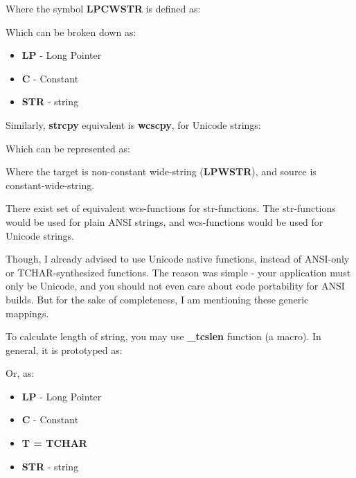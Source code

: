 	
	Where the symbol \textbf{LPCWSTR} is defined as:
	
	
	Which can be broken down as:\\
	
	\begin{itemize}
		\item \textbf{LP} - Long Pointer
		\item \textbf{C} - Constant
		\item \textbf{STR} - string
	\end{itemize}
	
	
	Similarly, \textbf{strcpy} equivalent is \textbf{wcscpy}, for Unicode strings:
	
	
	Which can be represented as:\\
	
	
	Where the target is non-constant wide-string (\textbf{LPWSTR}), and source is constant-wide-string.
	
	There exist set of equivalent wcs-functions for str-functions. The str-functions would be used for plain ANSI strings, and wcs-functions would be used for Unicode strings.
	
	Though, I already advised to use Unicode native functions, instead of ANSI-only or TCHAR-synthesized functions. The reason was simple - your application must only be Unicode, and you should not even care about code portability for ANSI builds. But for the sake of completeness, I am mentioning these generic mappings.
	
	To calculate length of string, you may use \textbf{\_tcslen} function (a macro). In general, it is prototyped as:\\
	
	
	Or, as:
	
	
	\begin{itemize}
		\item \textbf{LP} - Long Pointer
		\item \textbf{C} - Constant
		\item \textbf{T = TCHAR}
		\item \textbf{STR} - string
	\end{itemize}
	
